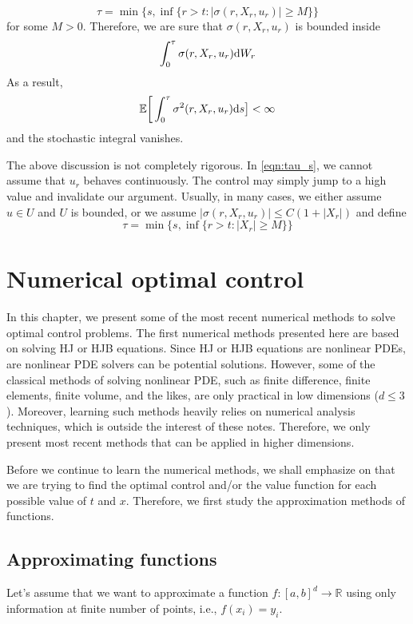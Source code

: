 \documentclass[11pt]{book}
\newcommand{\ds}{\text{\normalfont d}s}
\newcommand{\dW}{\text{\normalfont d}W}
\begin{document}
\begin{equation}\label{eqn:tau_s}
    \tau=\min\Big\{s,\inf\{r>t: |\sigma(r,X_r,u_r)|\ge M \}\Big\}
\end{equation}
for some $M>0$. Therefore, we are sure that  $\sigma(r,X_r,u_r)$ is bounded inside
\[
\int_0^\tau \sigma(r,X_r,u_r)\dW_r
\]
As a result, 
\[
\mathbb{E}\bigg[\int_0^\tau \sigma^2(r,X_r,u_r)\ds\big]<\infty
\]
and the stochastic integral vanishes. 
\begin{rem}
    The above discussion is not completely rigorous. In \eqref{eqn:tau_s}, we cannot assume that $u_r$ behaves continuously. The control may simply jump to a high value and invalidate our argument. Usually, in many cases, we either assume $u\in U$ and $U$ is bounded, or we assume $|\sigma(r,X_r,u_r)|\le C(1+|X_r|)$ and define 
    \[
    \tau=\min\Big\{s,\inf\{r>t: |X_r|\ge M \}\Big\}
    \]
\end{rem}


\chapter{Numerical optimal control}
In this chapter, we present some of the most recent numerical methods to solve optimal control problems. The first numerical methods presented here are based on solving HJ or HJB equations. Since HJ or HJB equations are nonlinear PDEs, are nonlinear PDE solvers can be potential solutions. However, some of the classical methods  of solving nonlinear PDE, such as finite difference, finite elements, finite volume, and the likes, are only practical in low dimensions ($d\le3$). Moreover, learning such methods heavily relies on numerical analysis techniques, which is outside the interest of these notes. Therefore, we only present most recent methods that can be applied in higher dimensions.

Before we continue to learn the numerical methods, we shall emphasize on that we are trying to find the optimal control and/or the value function for each possible value of $t$ and $x$. Therefore, we first study the approximation methods of functions. 

\section{Approximating functions}
Let's assume that we want to approximate a function $f:[a,b]^d\to\mathbb{R}$ using only information at finite number of points, i.e., $f(x_i)=y_i$.
\end{document}

